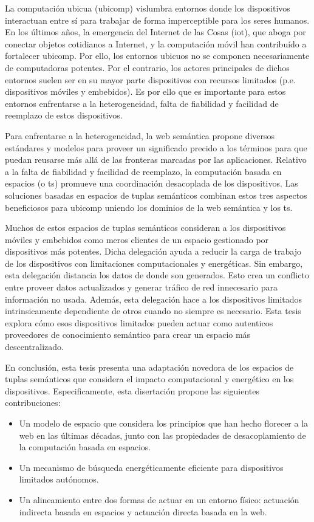 \begin{resumen}        %
La computación ubicua (\acs{ubicomp}) vislumbra entornos donde los dispositivos interactuan entre sí para trabajar de forma imperceptible para los seres humanos.
En los últimos años, la emergencia del Internet de las Cosas (\acs{iot}), que aboga por conectar objetos cotidianos a Internet, y la computación móvil han contribuído a fortalecer \ac{ubicomp}.
Por ello, los entornos ubicuos no se componen necesariamente de computadoras potentes.
Por el contrario, los actores principales de dichos entornos suelen ser en su mayor parte dispositivos con recursos limitados (p.e. dispositivos móviles y embebidos).
Es por ello que es importante para estos entornos enfrentarse a la heterogeneidad, falta de fiabilidad y facilidad de reemplazo de estos dispositivos.


Para enfrentarse a la heterogeneidad, la web semántica propone diversos estándares y modelos para proveer un significado precido a los términos para que puedan reusarse más allá de las fronteras marcadas por las aplicaciones.
Relativo a la falta de fiabilidad y facilidad de reemplazo, la computación basada en espacios (o \acl{ts}) promueve una coordinación desacoplada de los dispositivos.
Las soluciones basadas en espacios de tuplas semánticos combinan estos tres aspectos beneficiosos para \ac{ubicomp} uniendo los dominios de la web semántica y los \acl{ts}.


Muchos de estos espacios de tuplas semánticos consideran a los dispositivos móviles y embebidos como meros clientes de un espacio gestionado por dispositivos más potentes.
Dicha delegación ayuda a reducir la carga de trabajo de los dispositivos con limitaciones computacionales y energéticas.
Sin embargo, esta delegación distancia los datos de donde son generados.
Esto crea un conflicto entre proveer datos actualizados y generar tráfico de red innecesario para información no usada.
Además, esta delegación hace a los dispositivos limitados intrinsicamente dependiente de otros cuando no siempre es necesario.
Esta tesis explora cómo esos dispositivos limitados pueden actuar como autenticos proveedores de conocimiento semántico para crear un espacio más descentralizado.


En conclusión, esta tesis presenta una adaptación novedora de los espacios de tuplas semánticos que considera el impacto computacional y energético en los dispositivos.
Especificamente, esta disertación propone las siguientes contribuciones:
\begin{itemize}
  \item Un modelo de espacio que considera los principios que han hecho florecer a la web en las últimas décadas, junto con las propiedades de desacoplamiento de la computación basada en espacios.
  \item Un mecanismo de búsqueda energéticamente eficiente para dispositivos limitados autónomos.
  \item Un alineamiento entre dos formas de actuar en un entorno físico: actuación indirecta basada en espacios y actuación directa basada en la web.
\end{itemize}

\end{resumen}
